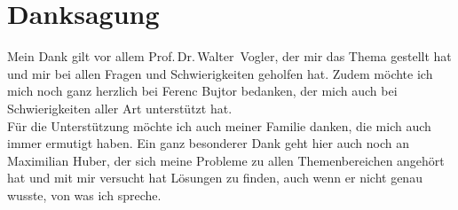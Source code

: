 \chapter*{Danksagung}
Mein Dank gilt vor allem Prof.\,Dr.\,Walter~Vogler, der mir das Thema gestellt hat
und mir bei allen Fragen und Schwierigkeiten geholfen hat. Zudem möchte ich
mich noch ganz herzlich bei Ferenc Bujtor bedanken, der mich auch bei
Schwierigkeiten aller Art unterstützt hat.\\
Für die Unterstützung möchte ich auch meiner Familie danken, die mich auch
immer ermutigt haben. Ein ganz besonderer Dank geht hier auch noch an
Maximilian Huber, der sich meine Probleme zu allen Themenbereichen angehört hat
und mit mir versucht hat Lösungen zu finden, auch wenn er nicht genau wusste,
von was ich spreche.
